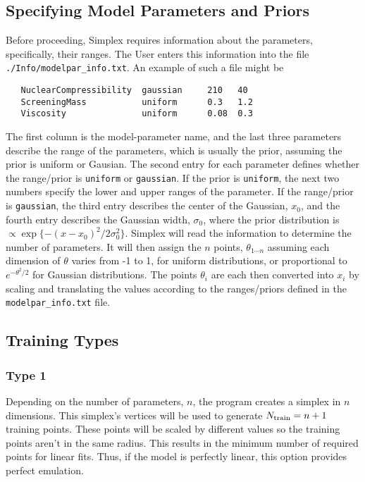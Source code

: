 \documentclass[UserManual.tex]{subfiles}
\begin{document}
\subsection{Specifying Model Parameters and Priors}\label{subsec:modelparinfo}
Before proceeding, Simplex requires information about the parameters, specifically, their ranges. The User enters this information into the file {\tt ./Info/modelpar\_info.txt}. An example of such a file might be
{\tt\begin{verbatim}
   NuclearCompressibility  gaussian     210   40
   ScreeningMass           uniform      0.3   1.2
   Viscosity               uniform      0.08  0.3
\end{verbatim}
}
The first column is the model-parameter name, and the last three parameters describe the range of the parameters, which is usually the prior, assuming the prior is uniform or Gausian. The second entry for each parameter defines whether the range/prior is {\tt uniform} or {\tt gaussian}. If the prior is {\tt uniform}, the next two numbers specify the lower and upper ranges of the parameter. If the range/prior is {\tt gaussian}, the third entry describes the center of the Gaussian, $x_0$, and the fourth entry describes the Gaussian width, $\sigma_0$, where the prior distribution is $\propto \exp\{-(x-x_0)^2/2\sigma_0^2\}$. Simplex will read the information to determine the number of parameters. It will then assign the $n$ points, $\theta_{1\cdots n}$ assuming each dimension of $\theta$ varies from -1 to 1, for uniform distributions, or proportional to $e^{-\theta^2/2}$ for Gaussian distributions. The points $\theta_i$ are each then converted into $x_i$ by scaling and translating the values according to the ranges/priors defined in the {\tt modelpar\_info.txt} file.

\subsection{Training Types}

\subsubsection{Type 1}
 Depending on the number of parameters, $n$, the program creates a simplex in $n$ dimensions. This simplex's vertices will be used to generate $N_{\rm train}=n+1$ training points. These points will be scaled by different values so the training points aren't in the same radius. This results in the minimum number of required points for linear fits. Thus, if the model is perfectly linear, this option provides perfect emulation. 
\end{document}
